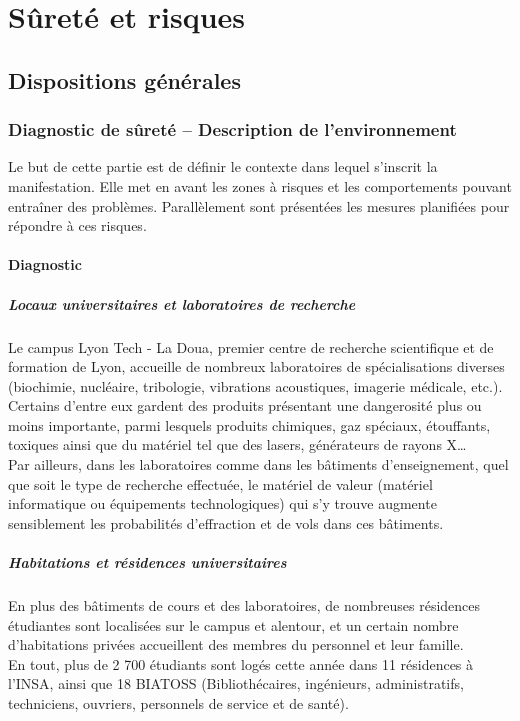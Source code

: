 \documentclass[hidelinks, paper=a4, fontsize=13pt]{report}
\begin{document}
\chapter{Sûreté et risques}
\section{Dispositions générales}
\subsection{Diagnostic de sûreté – Description de l’environnement}
Le but de cette partie est de définir le contexte dans lequel s’inscrit la manifestation. Elle met en avant les zones à risques et les comportements pouvant entraîner des problèmes. Parallèlement sont présentées les mesures planifiées pour répondre à ces risques.

\subsubsection{Diagnostic}
\paragraph{Locaux universitaires et laboratoires de recherche}
Le campus Lyon Tech - La Doua, premier centre de recherche scientifique et de formation de Lyon, accueille de nombreux laboratoires de spécialisations diverses (biochimie, nucléaire, tribologie, vibrations acoustiques, imagerie médicale, etc.). Certains d’entre eux gardent des produits présentant une dangerosité plus ou moins importante, parmi lesquels produits chimiques, gaz spéciaux, étouffants, toxiques ainsi que du matériel tel que des lasers, générateurs de rayons X…\\

Par ailleurs, dans les laboratoires comme dans les bâtiments d’enseignement, quel que soit le type de recherche effectuée, le matériel de valeur (matériel informatique ou équipements technologiques) qui s'y trouve augmente sensiblement les probabilités d’effraction et de vols dans ces bâtiments. 

\paragraph{Habitations et résidences universitaires}
En plus des bâtiments de cours et des laboratoires, de nombreuses résidences étudiantes sont localisées sur le campus et alentour, et un certain nombre d’habitations privées accueillent des membres du personnel et leur famille.\\
En tout, plus de 2 700 étudiants sont logés cette année dans 11 résidences à l’INSA, ainsi que 18 BIATOSS (Bibliothécaires, ingénieurs, administratifs, techniciens, ouvriers, personnels de service et de santé).
\end{document}
